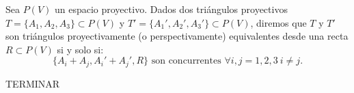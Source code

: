 \begin{definicion}
    Sea $P(V)$ un espacio proyectivo.
    Dados dos triángulos proyectivos $T = \{A_1, A_2, A_3\}\subset P(V)$ y $T' = \{A_1', A_2', A_3'\}\subset P(V)$,
    diremos que $T$ y $T'$ son triángulos proyectivamente (o perspectivamente) equivalentes desde una recta $R \subset P(V)$ si y solo si:
    \begin{equation*}
        \{A_i + A_j, A_i' + A_j', R\} \text{ son concurrentes } \forall i,j=1,2,3~i\neq j.
    \end{equation*}
\end{definicion}



TERMINAR %